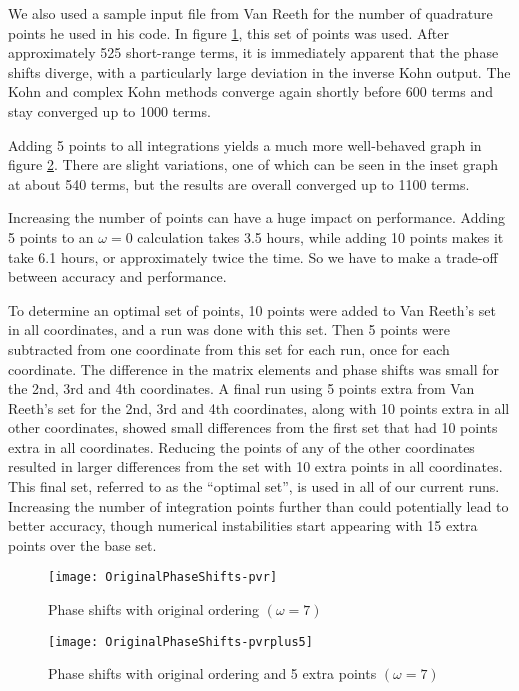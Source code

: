 \documentclass[Dissertation.tex]{subfiles}
\begin{document}
We also used a sample input file from Van Reeth for the number of quadrature points he used in his code. In figure \ref{fig:OriginalPhaseShifts-pvr}, this set of points was used. After approximately 525 short-range terms, it is immediately apparent that the phase shifts diverge, with a particularly large deviation in the inverse Kohn output. The Kohn and complex Kohn methods converge again shortly before 600 terms and stay converged up to 1000 terms.

Adding 5 points to all integrations yields a much more well-behaved graph in figure \ref{fig:OriginalPhaseShifts-pvrplus5}. There are slight variations, one of which can be seen in the inset graph at about 540 terms, but the results are overall converged up to 1100 terms.

Increasing the number of points can have a huge impact on performance. Adding 5 points to an $\omega = 0$ calculation takes 3.5 hours, while adding 10 points makes it take 6.1 hours, or approximately twice the time. So we have to make a trade-off between accuracy and performance.

To determine an optimal set of points, 10 points were added to Van Reeth's set in all coordinates, and a run was done with this set. Then 5 points were subtracted from one coordinate from this set for each run, once for each coordinate. The difference in the matrix elements and phase shifts was small for the 2nd, 3rd and 4th coordinates. A final run using 5 points extra from Van Reeth's set for the 2nd, 3rd and 4th coordinates, along with 10 points extra in all other coordinates, showed small differences from the first set that had 10 points extra in all coordinates. Reducing the points of any of the other coordinates resulted in larger differences from the set with 10 extra points in all coordinates. This final set, referred to as the ``optimal set'', is used in all of our current runs. Increasing the number of integration points further than could potentially lead to better accuracy, though numerical instabilities start appearing with 15 extra points over the base set.


\begin{figure}[H]
	\centering
	\texttt{[image: OriginalPhaseShifts-pvr]}
	\caption{Phase shifts with original ordering $(\omega = 7)$}
	\label{fig:OriginalPhaseShifts-pvr}
\end{figure}

\begin{figure}[H]
	\centering
	\texttt{[image: OriginalPhaseShifts-pvrplus5]}
	\caption{Phase shifts with original ordering and 5 extra points $(\omega = 7)$}
	\label{fig:OriginalPhaseShifts-pvrplus5}
\end{figure}
\end{document}
